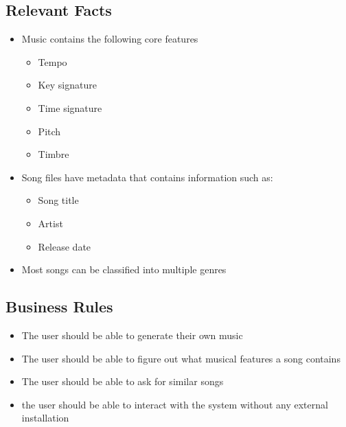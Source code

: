\documentclass[12pt]{article}
\begin{document}
\subsection{Relevant Facts}
\begin{itemize}
  \item Music contains the following core features \begin{itemize}
    \item Tempo
    \item Key signature
    \item Time signature
    \item Pitch
    \item Timbre
  \end{itemize}
  \item Song files have metadata that contains information such as: \begin{itemize}
    \item Song title
    \item Artist
    \item Release date
  \end{itemize}
  \item Most songs can be classified into multiple genres
\end{itemize}
\subsection{Business Rules}
\begin{itemize}
  \item The user should be able to generate their own music
  \item The user should be able to figure out what musical features a song contains 
  \item The user should be able to ask for similar songs
  \item the user should be able to interact with the system without any external installation
\end{itemize}
\end{document}
